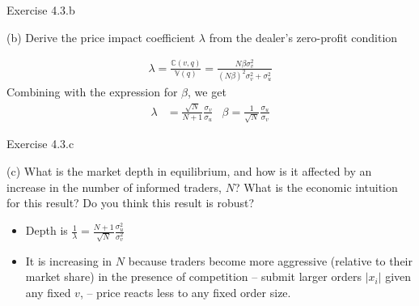\documentclass[english,10pt
,handout
,aspectratio=169
]{beamer}
\begin{document}
\begin{frame}{Exercise 4.3.b}
	\begin{exampleblock}{}
		(b) Derive the price impact coefficient $\lambda$ from the dealer's zero-profit condition
	\end{exampleblock}

	\pause
	
	\begin{align*}
		\lambda = \frac{\mathbb{C}(v,q)}{\mathbb{V}(q)} = \frac{N \beta \sigma^2_v}{(N \beta)^2 \sigma^2_v + \sigma^2_u}	
	\end{align*}
	Combining with the expression for $\beta$, we get
	\begin{align*}
		\lambda &= \frac{\sqrt{N}}{N+1} \frac{\sigma_v}{\sigma_u} 
		&
		\beta = \frac{1}{\sqrt{N}} \frac{\sigma_u}{\sigma_v}
	\end{align*}
\end{frame}


\begin{frame}{Exercise 4.3.c}
	\begin{exampleblock}{}
		(c) What is the market depth in equilibrium, and how is it affected by an increase in the number of informed traders, $N$? What is the economic intuition for this result?
		Do you think this result is robust?
	\end{exampleblock}
	
	\pause
	
	\begin{itemize}
		\item Depth is $\frac{1}{\lambda} = \frac{N+1}{\sqrt{N}} \frac{\sigma^2_u}{\sigma^2_v} $
		\item It is increasing in $N$ because traders become more aggressive (relative to their market share) in the presence of competition -- submit larger orders $|x_i|$ given any fixed $v$, -- price reacts less to any fixed order size.
	\end{itemize}
\end{frame}
\end{document}
